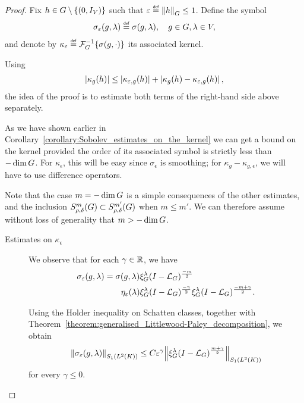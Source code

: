 \begin{proof}
    Fix $h \in G \setminus \{(0, {I_{V}})\}$ such that $\epsilon \defeq \norm [\Group] h \leq 1$.
    Define the symbol
    \begin{align*}
        \sigma_\epsilon(g, \lambda) \defeq \sigma(g, \lambda),
        \quad g \in \Group, \lambda \in \VectorSpace,
    \end{align*}
    and denote by $\kappa_\epsilon \defeq \InverseFourier \{\sigma(g, \dummy)\}$
    its associated kernel.

    Using
    \begin{align*}
        \left|{\kappa_g(h)}\right| \leq \left|{\kappa_{\varepsilon, g}(h)}\right| + \left|{\kappa_g(h) - \kappa_{\varepsilon, g}(h)}\right|,
    \end{align*}
    the idea of the proof is to estimate both terms of the right-hand side above separately.

    As we have shown earlier in Corollary~\ref{corollary:Sobolev_estimates_on_the_kernel}
    we can get a bound on the kernel provided the order of its associated symbol is strictly less than $-\dim G$.
    For $\kappa_\epsilon$, this will be easy since $\sigma_\epsilon$ is smoothing;
    for $\kappa_g - \kappa_{g, \epsilon}$, we will have to use difference operators.

    Note that the case $m = -\dim G$ is a simple consequences of the other estimates,
    and the inclusion $S^{m}_{\rho, \delta}(G) \subset S^{m'}_{\rho, \delta}(G)$ when $m \leq m'$.
    We can therefore assume without loss of generality that $m > -\dim G$.

    \begin{description}
        \item[Estimates on $\kappa_\epsilon$]
            We observe that for each $\gamma \in \mathbb{R}$,
            we have
            \begin{align*}
                \sigma_\varepsilon(g, \lambda)
                &= \sigma(g, \lambda) \xi^{\lambda}_{G} (I - {\mathcal{L}_{G}})^\frac{-m}{2}\\
                &\qquad \eta_\varepsilon(\lambda) \xi^{\lambda}_{G} (I - {\mathcal{L}_{G}})^\frac{-\gamma}{2}
                \xi^{\lambda}_{G} (I - {\mathcal{L}_{G}})^\frac{-m + \gamma}{2}.
            \end{align*}

            Using the Holder inequality on Schatten classes,
            together with Theorem~\ref{theorem:generalised_Littlewood-Paley_decomposition},
            we obtain
            \begin{align}
                \norm [\SchattenClasses 1 {\Lebesgue 2 \CompactGroup}] {\sigma_\epsilon(g, \lambda)} \leq C
                \epsilon^{\gamma} \norm [\SchattenClasses 1 {\Lebesgue 2 \CompactGroup}] {\Rep \lambda \BesselPotential {m + \gamma}}
                \label{eq:estimate_on_the_schatten_norm_of_sigma_epsilon}
            \end{align}
            for every $\gamma \leq 0$.


\end{description}
\end{proof}
